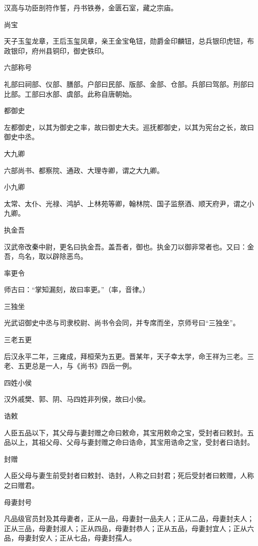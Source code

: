 \documentclass[a4paper,12pt,UTF8,twoside]{ctexbook}
\begin{document}
    汉高与功臣剖符作誓，丹书铁券，金匮石室，藏之宗庙。
    
    尚宝
    
    天子玉玺龙章，王后玉玺凤章，亲王金宝龟钮，勋爵金印麟钮，总兵银印虎钮，布政银印，府州县铜印，御史铁印。
    
    六部称号
    
    礼部曰祠部、仪部、膳部。户部曰民部、版部、金部、仓部。兵部曰驾部。刑部曰比部。工部曰水部、虞部。此称自唐朝始。
    
    都御史
    
    左都御史，以其为御史之率，故曰御史大夫。巡抚都御史，以其为宪台之长，故曰御史中丞。
    
    大九卿
    
    六部尚书、都察院、通政、大理寺卿，谓之大九卿。
    
    小九卿
    
    太常、太仆、光禄、鸿胪、上林苑等卿，翰林院、国子监祭酒、顺天府尹，谓之小九卿。
    
    执金吾
    
    汉武帝改秦中尉，更名曰执金吾。盖吾者，御也。执金刀以御非常者也。又曰：金吾，鸟名，取以辟除恶鸟。
    
    率更令
    
    师古曰：“掌知漏刻，故曰率更。”（率，音律。）
    
    三独坐
    
    光武诏御史中丞与司隶校尉、尚书令会同，并专席而坐，京师号曰“三独坐”。
    
    三老五更
    
    后汉永平二年，三雍成，拜桓荣为五更。晋某年，天子幸太学，命王祥为三老。三老、五更总是一人，与《尚书》四岳一例。
    
    四姓小侯
    
    汉外戚樊、郭、阴、马四姓非列侯，故曰小侯。
    
    诰敕
    
    人臣五品以下，其父母与妻封赠之命曰敕命，其宝用敕命之宝，受封者曰敕封。五品以上，其祖父母、父母与妻封赠之命曰诰命，其宝用诰命之宝，受封者曰诰封。
    
    封赠
    
    人臣父母与妻生前受封者曰敕封、诰封，人称之曰封君；死后受封者曰敕赠，人称之曰赠君。
    
    母妻封号
    
    凡品级官员封及其母妻者，正从一品，母妻封一品夫人；正从二品，母妻封夫人；正从三品，母妻封淑人；正从四品，母妻封恭人；正从五品，母妻封宜人；正从六品，母妻封安人；正从七品，母妻封孺人。
    
\end{document}
